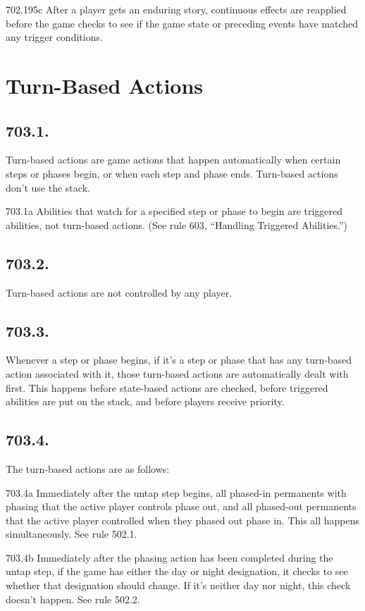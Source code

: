702.195c After a player gets an enduring story, continuous effects are reapplied before the game checks to see if the game state or preceding events have matched any trigger conditions.

\section{Turn-Based Actions}
\subsection*{703.1.}
Turn-based actions are game actions that happen automatically when certain steps or phases begin, or when each step and phase ends. Turn-based actions don’t use the stack.

703.1a Abilities that watch for a specified step or phase to begin are triggered abilities, not turn-based actions. (See rule 603, “Handling Triggered Abilities.”)

\subsection*{703.2.}
Turn-based actions are not controlled by any player.

\subsection*{703.3.}
Whenever a step or phase begins, if it’s a step or phase that has any turn-based action associated with it, those turn-based actions are automatically dealt with first. This happens before state-based actions are checked, before triggered abilities are put on the stack, and before players receive priority.

\subsection*{703.4.}
The turn-based actions are as follows:

703.4a Immediately after the untap step begins, all phased-in permanents with phasing that the active player controls phase out, and all phased-out permanents that the active player controlled when they phased out phase in. This all happens simultaneously. See rule 502.1.

703.4b Immediately after the phasing action has been completed during the untap step, if the game has either the day or night designation, it checks to see whether that designation should change. If it’s neither day nor night, this check doesn’t happen. See rule 502.2.

